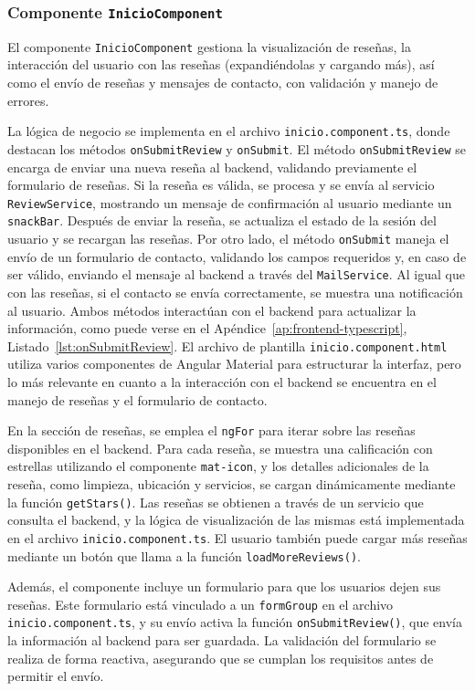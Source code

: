 \subsubsection{Componente \texttt{InicioComponent}}

El componente \texttt{InicioComponent} gestiona la visualización de reseñas, la interacción del usuario con las reseñas (expandiéndolas y cargando más), así como el envío de reseñas y mensajes de contacto, con validación y manejo de errores.

La lógica de negocio se implementa en el archivo \texttt{inicio.component.ts}, donde destacan los métodos \texttt{onSubmitReview} y \texttt{onSubmit}. El método \texttt{onSubmitReview} se encarga de enviar una nueva reseña al backend, validando previamente el formulario de reseñas. Si la reseña es válida, se procesa y se envía al servicio \texttt{ReviewService}, mostrando un mensaje de confirmación al usuario mediante un \texttt{snackBar}. Después de enviar la reseña, se actualiza el estado de la sesión del usuario y se recargan las reseñas. Por otro lado, el método \texttt{onSubmit} maneja el envío de un formulario de contacto, validando los campos requeridos y, en caso de ser válido, enviando el mensaje al backend a través del \texttt{MailService}. Al igual que con las reseñas, si el contacto se envía correctamente, se muestra una notificación al usuario. Ambos métodos interactúan con el backend para actualizar la información, como puede verse en el Apéndice~\ref{ap:frontend-typescript}, Listado~\ref{lst:onSubmitReview}.
El archivo de plantilla \texttt{inicio.component.html} utiliza varios componentes de Angular Material para estructurar la interfaz, pero lo más relevante en cuanto a la interacción con el backend se encuentra en el manejo de reseñas y el formulario de contacto.

En la sección de reseñas, se emplea el \texttt{ngFor} para iterar sobre las reseñas disponibles en el backend. Para cada reseña, se muestra una calificación con estrellas utilizando el componente \texttt{mat-icon}, y los detalles adicionales de la reseña, como limpieza, ubicación y servicios, se cargan dinámicamente mediante la función \texttt{getStars()}. Las reseñas se obtienen a través de un servicio que consulta el backend, y la lógica de visualización de las mismas está implementada en el archivo \texttt{inicio.component.ts}. El usuario también puede cargar más reseñas mediante un botón que llama a la función \texttt{loadMoreReviews()}.

Además, el componente incluye un formulario para que los usuarios dejen sus reseñas. Este formulario está vinculado a un \texttt{formGroup} en el archivo \texttt{inicio.component.ts}, y su envío activa la función \texttt{onSubmitReview()}, que envía la información al backend para ser guardada. La validación del formulario se realiza de forma reactiva, asegurando que se cumplan los requisitos antes de permitir el envío.

